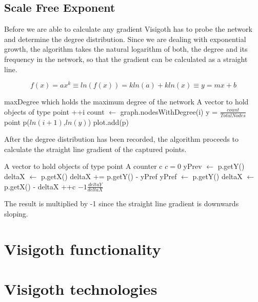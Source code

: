 \documentclass[a4paper,11pt,titlepage]{article}
\let\stdsection\section         %
\renewcommand{\section}{\newpage\stdsection}
\begin{document}
\subsection{Scale Free Exponent}

Before we are able to calculate any gradient Visigoth has to probe the network
and determine the degree distribution. Since we are dealing with exponential
growth, the algorithm takes the natural logarithm of both, the degree and its
frequency in the network, so that the gradient can be calculated as a straight
line.

\[
f(x) = ax^k \equiv ln(f(x)) = kln(a) + kln(x) \equiv y = mx + b
\]

\begin{algorithmic}
\REQUIRE maxDegree which holds the maximum degree of the network
\REQUIRE A vector to hold objects of type point
	\STATE ++i
	\STATE count $\gets$ graph.nodesWithDegree(i)
	\STATE y = $\frac{count}{Total Nodes}$
		\STATE  point p($ln(i+1)$,$ln(y)$)
		\STATE plot.add(p)
	\ENDIF
\ENDFOR
\end{algorithmic}

After the degree distribution has been recorded, the algorithm proceeds to
calculate the straight line gradient of the captured points.

\begin{algorithmic}
\REQUIRE A vector to hold objects of type point
\REQUIRE A counter c
\STATE $c = 0$
		\STATE yPrev $\gets$ p.getY()
		\STATE  deltaX $\gets$ p.getX()
	\ELSE
		\STATE deltaX += p.getY() - yPref
		\STATE yPref $\gets$ p.getY()
		\STATE deltaX $\gets$ p.getX() - deltaX
	\ENDIF
		\STATE ++c
\ENDFOR
\RETURN $-1\frac{deltaY}{deltaX}$
\end{algorithmic}

The result is multiplied by -1 since the straight line gradient is downwards
sloping.



\section{Visigoth functionality}



\section{Visigoth technologies}
\end{document}
